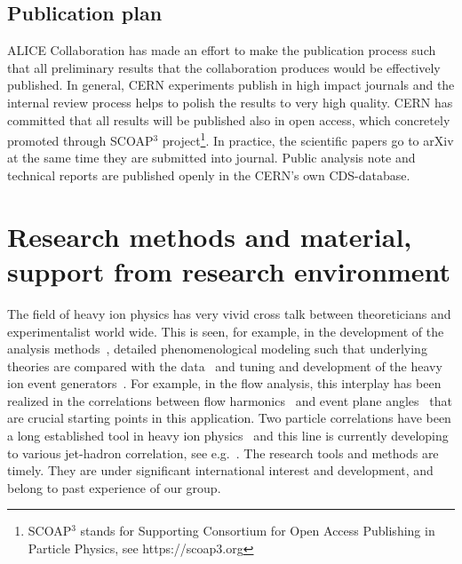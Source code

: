 \subsection{Publication plan}

ALICE Collaboration has made an effort to make the publication process such that all preliminary results that the collaboration produces would be effectively published. In general, CERN experiments publish in high impact journals and the internal review process helps to polish the results to very high quality. CERN has committed that all results will be published also in open access, which concretely promoted through SCOAP$^3$ project\footnote{SCOAP$^3$ stands for Supporting Consortium for Open Access Publishing in Particle Physics, see https://scoap3.org}. In practice, the scientific papers go to arXiv at the same time they are submitted into journal. Public analysis note and technical reports are published openly in the CERN's own CDS-database.

\section{Research methods and material, support from research environment} %
\label{sec:researchmethods}

The field of heavy ion physics has very vivid cross talk between theoreticians and experimentalist world wide. This is seen, for example, in the development of the analysis methods~\cite{Poskanzer:1998yz,Bilandzic:2010jr}, detailed phenomenological modeling such that underlying theories are compared with the data~\cite{Burke:2013yra,Renk:2011gj,Niemi:2015qia} and tuning and development of the heavy ion event generators~\cite{Gyulassy:1994ew,Lin:2004en,Lokhtin2006}. For example, in the flow analysis, this interplay has been realized in the correlations between flow harmonics~\cite{Poskanzer:1998yz,ALICE:2011ab} and event plane angles~\cite{Aad:2014fla,Bhalerao:2014xra} that are crucial starting points in this application. Two particle correlations have been a long established tool in heavy ion physics~\cite{PhysRevLett.95.152301,PhysRevLett.97.052301} and this line is currently developing to various jet-hadron correlation, see e.g.~\cite{Khachatryan:2016tfj}. The research tools and methods are timely. They are under significant international interest and development, and belong to past experience of our group.


